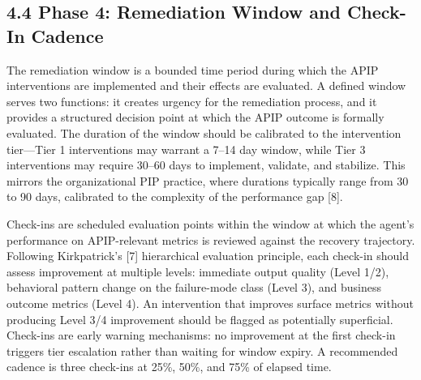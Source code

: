 \subsection{4.4  Phase 4: Remediation Window and Check-In Cadence}

The remediation window is a bounded time period during which the APIP interventions are implemented and their effects are evaluated. A defined window serves two functions: it creates urgency for the remediation process, and it provides a structured decision point at which the APIP outcome is formally evaluated. The duration of the window should be calibrated to the intervention tier---Tier 1 interventions may warrant a 7--14 day window, while Tier 3 interventions may require 30--60 days to implement, validate, and stabilize. This mirrors the organizational PIP practice, where durations typically range from 30 to 90 days, calibrated to the complexity of the performance gap [8].

Check-ins are scheduled evaluation points within the window at which the agent's performance on APIP-relevant metrics is reviewed against the recovery trajectory. Following Kirkpatrick's [7] hierarchical evaluation principle, each check-in should assess improvement at multiple levels: immediate output quality (Level 1/2), behavioral pattern change on the failure-mode class (Level 3), and business outcome metrics (Level 4). An intervention that improves surface metrics without producing Level 3/4 improvement should be flagged as potentially superficial. Check-ins are early warning mechanisms: no improvement at the first check-in triggers tier escalation rather than waiting for window expiry. A recommended cadence is three check-ins at 25\%, 50\%, and 75\% of elapsed time.

